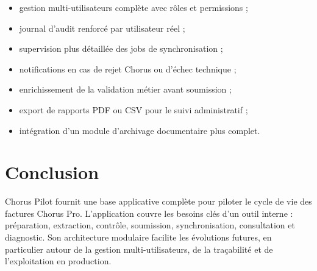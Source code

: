 \documentclass[11pt,a4paper]{article}
\begin{document}
\begin{itemize}
  \item gestion multi-utilisateurs complète avec rôles et permissions ;
  \item journal d'audit renforcé par utilisateur réel ;
  \item supervision plus détaillée des jobs de synchronisation ;
  \item notifications en cas de rejet Chorus ou d'échec technique ;
  \item enrichissement de la validation métier avant soumission ;
  \item export de rapports PDF ou CSV pour le suivi administratif ;
  \item intégration d'un module d'archivage documentaire plus complet.
\end{itemize}

\section{Conclusion}

Chorus Pilot fournit une base applicative complète pour piloter le cycle de
vie des factures Chorus Pro. L'application couvre les besoins clés d'un outil
interne : préparation, extraction, contrôle, soumission, synchronisation,
consultation et diagnostic. Son architecture modulaire facilite les évolutions
futures, en particulier autour de la gestion multi-utilisateurs, de la
traçabilité et de l'exploitation en production.
\end{document}
